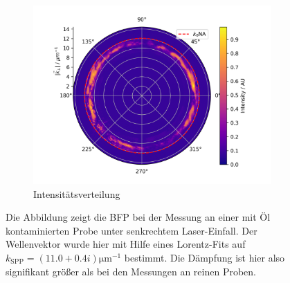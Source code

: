 \documentclass[titlepage]{article}
\begin{document}
\begin{figure}[h!]
		\begin{subfigure}[b]{0.7\textwidth}
		\centering
		\includegraphics[width=\textwidth]{figures/dirt_polar.png}
		\caption{Intensitätsverteilung}
		\label{fig:dirt_polar}
		\end{subfigure}
		\caption[Messung an kontaminierter Probe]{Die Abbildung zeigt die BFP bei der Messung an einer mit Öl kontaminierten Probe unter senkrechtem Laser-Einfall. Der Wellenvektor wurde hier mit Hilfe eines Lorentz-Fits auf $k_\mathrm{SPP} = (11.0 + 0.4i)\mathrm{\mu m}^{-1}$ bestimmt. Die Dämpfung ist hier also signifikant größer als bei den Messungen an reinen Proben.}			
	\end{figure}
\end{document}
